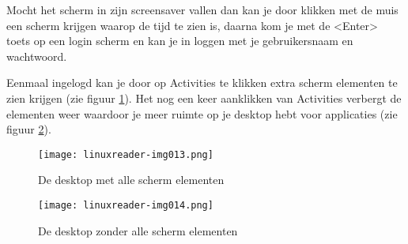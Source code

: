 Mocht het scherm in zijn screensaver vallen dan kan je door klikken met de muis een scherm krijgen waarop
de tijd te zien is, daarna kom je met de {\textless}Enter{\textgreater} toets op een login scherm en kan je in loggen met je
gebruikersnaam en wachtwoord.

Eenmaal ingelogd kan je door op Activities te klikken extra scherm elementen te zien krijgen (zie figuur \ref{fig:de_activities}). Het nog een keer
aanklikken van Activities verbergt de elementen weer waardoor je meer ruimte op je desktop hebt voor applicaties (zie figuur \ref{fig:de_deactivities}).

\begin{figure}[H]
\texttt{[image: linuxreader-img013.png]}
	\caption{De desktop met alle scherm elementen}
	\label{fig:de_activities}
\end{figure}
\begin{figure}[H]
\texttt{[image: linuxreader-img014.png]}
	\caption{De desktop zonder alle scherm elementen}
	\label{fig:de_deactivities}
\end{figure}
